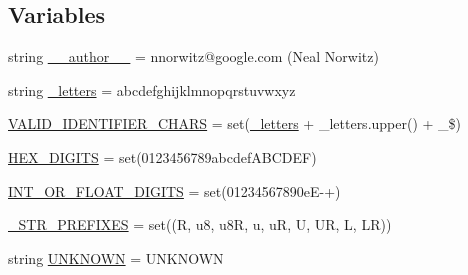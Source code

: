\subsection*{Variables}
\begin{DoxyCompactItemize}
\item 
string \mbox{\hyperlink{namespacegoogletest-master_1_1googlemock_1_1scripts_1_1generator_1_1cpp_1_1tokenize_aefdd4f3874b9aed4abf7fe1422f73271}{\+\_\+\+\_\+author\+\_\+\+\_\+}} = \textquotesingle{}nnorwitz@google.\+com (Neal Norwitz)\textquotesingle{}
\item 
string \mbox{\hyperlink{namespacegoogletest-master_1_1googlemock_1_1scripts_1_1generator_1_1cpp_1_1tokenize_a26080912b3f9525ba3fe4c4679cf38eb}{\+\_\+letters}} = \textquotesingle{}abcdefghijklmnopqrstuvwxyz\textquotesingle{}
\item 
\mbox{\hyperlink{namespacegoogletest-master_1_1googlemock_1_1scripts_1_1generator_1_1cpp_1_1tokenize_af2cb506273c339c2bdd8e6812791da77}{V\+A\+L\+I\+D\+\_\+\+I\+D\+E\+N\+T\+I\+F\+I\+E\+R\+\_\+\+C\+H\+A\+RS}} = set(\mbox{\hyperlink{namespacegoogletest-master_1_1googlemock_1_1scripts_1_1generator_1_1cpp_1_1tokenize_a26080912b3f9525ba3fe4c4679cf38eb}{\+\_\+letters}} + \+\_\+letters.\+upper() + \textquotesingle{}\+\_\$\textquotesingle{})
\item 
\mbox{\hyperlink{namespacegoogletest-master_1_1googlemock_1_1scripts_1_1generator_1_1cpp_1_1tokenize_a1d62f82c5cc5a9f098ed8e6b76883fe2}{H\+E\+X\+\_\+\+D\+I\+G\+I\+TS}} = set(\textquotesingle{}0123456789abcdef\+A\+B\+C\+D\+E\+F\textquotesingle{})
\item 
\mbox{\hyperlink{namespacegoogletest-master_1_1googlemock_1_1scripts_1_1generator_1_1cpp_1_1tokenize_ae00b1d087fb2181dead435788a2705ca}{I\+N\+T\+\_\+\+O\+R\+\_\+\+F\+L\+O\+A\+T\+\_\+\+D\+I\+G\+I\+TS}} = set(\textquotesingle{}01234567890e\+E-\/+\textquotesingle{})
\item 
\mbox{\hyperlink{namespacegoogletest-master_1_1googlemock_1_1scripts_1_1generator_1_1cpp_1_1tokenize_a237f1d53f4d2c934d154ae6cd26a0cc7}{\+\_\+\+S\+T\+R\+\_\+\+P\+R\+E\+F\+I\+X\+ES}} = set((\textquotesingle{}R\textquotesingle{}, \textquotesingle{}u8\textquotesingle{}, \textquotesingle{}u8R\textquotesingle{}, \textquotesingle{}u\textquotesingle{}, \textquotesingle{}uR\textquotesingle{}, \textquotesingle{}U\textquotesingle{}, \textquotesingle{}UR\textquotesingle{}, \textquotesingle{}L\textquotesingle{}, \textquotesingle{}LR\textquotesingle{}))
\item 
string \mbox{\hyperlink{namespacegoogletest-master_1_1googlemock_1_1scripts_1_1generator_1_1cpp_1_1tokenize_a41a82ba5380dea9ff0f3f69a91fb307e}{U\+N\+K\+N\+O\+WN}} = \textquotesingle{}U\+N\+K\+N\+O\+WN\textquotesingle{}

\end{DoxyCompactItemize}
